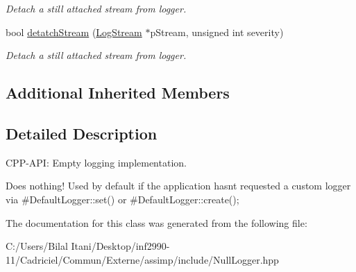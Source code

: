\begin{DoxyCompactItemize}
\begin{DoxyCompactList}\small\item\em Detach a still attached stream from logger. \end{DoxyCompactList}\item 
bool \hyperlink{class_assimp_1_1_null_logger_ab49b14a0045aab73b813a448b5aa77b4}{detatch\+Stream} (\hyperlink{class_assimp_1_1_log_stream}{Log\+Stream} $\ast$p\+Stream, unsigned int severity)\hypertarget{class_assimp_1_1_null_logger_ab49b14a0045aab73b813a448b5aa77b4}{}\label{class_assimp_1_1_null_logger_ab49b14a0045aab73b813a448b5aa77b4}

\begin{DoxyCompactList}\small\item\em Detach a still attached stream from logger. \end{DoxyCompactList}\end{DoxyCompactItemize}
\subsection*{Additional Inherited Members}


\subsection{Detailed Description}
C\+P\+P-\/\+A\+PI\+: Empty logging implementation. 

Does nothing! Used by default if the application hasn\textquotesingle{}t requested a custom logger via \#\+Default\+Logger\+::set() or \#\+Default\+Logger\+::create(); 

The documentation for this class was generated from the following file\+:\begin{DoxyCompactItemize}
\item 
C\+:/\+Users/\+Bilal Itani/\+Desktop/inf2990-\/11/\+Cadriciel/\+Commun/\+Externe/assimp/include/Null\+Logger.\+hpp\end{DoxyCompactItemize}
